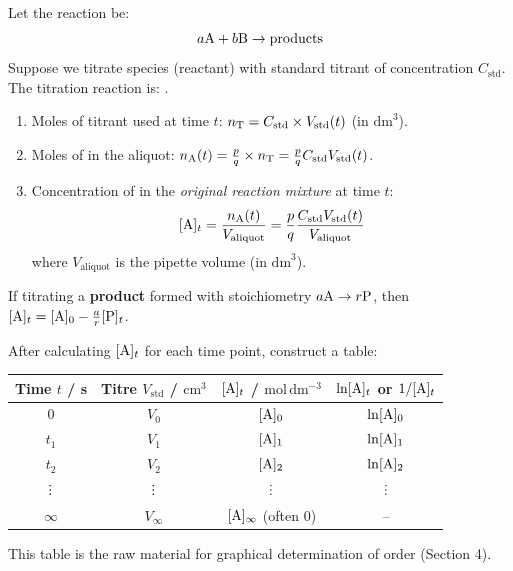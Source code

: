 \documentclass[11pt]{article}
\def\vdots{\mathord{\vbox{\baselineskip3.2pt\lineskiplimit0pt\kern4pt\hbox{.}\hbox{.}\hbox{.}}}}%
\begin{document}
\begin{methode}
Let the reaction be:
\[ a\ce{A} + b\ce{B} \rightarrow \text{products} \]
Suppose we titrate species  (reactant) with standard titrant  of concentration $C_{\text{std}}$.
The titration reaction is: .
\begin{enumerate}
    \item Moles of titrant used at time $t$: $n_{\ce{T}} = C_{\text{std}} \times V_{\text{std}}(t)$ (in $\mathrm{dm}^3$).
    \item Moles of  in the aliquot: $n_{\ce{A}}(t) = \frac{p}{q} \times n_{\ce{T}} = \frac{p}{q} C_{\text{std}} V_{\text{std}}(t)$.
    \item Concentration of  in the \emph{original reaction mixture} at time $t$:
    \[ [\ce{A}]_t = \frac{n_{\ce{A}}(t)}{V_{\text{aliquot}}} = \frac{p}{q} \frac{C_{\text{std}} V_{\text{std}}(t)}{V_{\text{aliquot}}} \]
    where $V_{\text{aliquot}}$ is the pipette volume (in $\mathrm{dm}^3$).
\end{enumerate}
If titrating a \textbf{product}  formed with stoichiometry $a\ce{A} \rightarrow r\ce{P}$, then $[\ce{A}]_t = [\ce{A}]_0 - \frac{a}{r}[\ce{P}]_t$.
\end{methode}

\begin{propriete}
After calculating $[\ce{A}]_t$ for each time point, construct a table:
\begin{center}
\begin{tabular}{|c|c|c|c|}\hline
\rowcolor{popblueL}
\textbf{Time $t$ / s} & \textbf{Titre $V_{\text{std}}$ / $\mathrm{cm}^3$} & \textbf{$[\ce{A}]_t$ / $\mathrm{mol\,dm^{-3}}$} & \textbf{$\ln[\ce{A}]_t$ or $1/[\ce{A}]_t$} \\ \hline
0 & $V_0$ & $[\ce{A}]_0$ & $\ln[\ce{A}]_0$ \\ \hline
$t_1$ & $V_1$ & $[\ce{A}]_1$ & $\ln[\ce{A}]_1$ \\ \hline
$t_2$ & $V_2$ & $[\ce{A}]_2$ & $\ln[\ce{A}]_2$ \\ \hline
$\vdots$ & $\vdots$ & $\vdots$ & $\vdots$ \\ \hline
$\infty$ & $V_\infty$ & $[\ce{A}]_\infty$ (often 0) & -- \\ \hline
\end{tabular}
\end{center}
This table is the raw material for graphical determination of order (Section 4).
\end{propriete}
\end{document}
